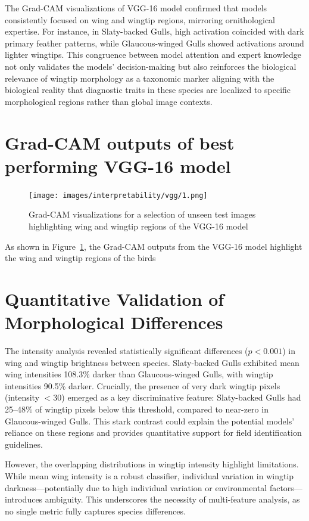 \documentclass[a4paper,12pt]{report}
\begin{document}
The Grad-CAM visualizations of VGG-16 model confirmed that models consistently focused on wing and wingtip regions, mirroring ornithological expertise. For instance, in Slaty-backed Gulls, high activation coincided with dark primary feather patterns, while Glaucous-winged Gulls showed activations around lighter wingtips. This congruence between model attention and expert knowledge not only validates the models’ decision-making but also reinforces the biological relevance of wingtip morphology as a taxonomic marker aligning with the biological reality that diagnostic traits in these species are localized to specific morphological regions rather than global image contexts.


\section{Grad-CAM outputs of best performing VGG-16 model}\label{sec:vg_grad}

\begin{figure}[H]
    \centering
    \texttt{[image: images/interpretability/vgg/1.png]}
    \caption{Grad-CAM visualizations for a selection of unseen test images highlighting wing and wingtip regions of the VGG-16 model}
    \label{fig:vgg16_gradcam}
\end{figure}

As shown in Figure~\ref{fig:vgg16_gradcam}, the Grad-CAM outputs from the VGG-16 model highlight the wing and wingtip regions of the birds
\section{Quantitative Validation of Morphological Differences}
The intensity analysis revealed statistically significant differences ($p < 0.001$) in wing and wingtip brightness between species. Slaty-backed Gulls exhibited mean wing intensities 108.3\% darker than Glaucous-winged Gulls, with wingtip intensities 90.5\% darker. Crucially, the presence of very dark wingtip pixels (intensity $<30$) emerged as a key discriminative feature: Slaty-backed Gulls had 25–48\% of wingtip pixels below this threshold, compared to near-zero in Glaucous-winged Gulls. This stark contrast could explain the potential models’ reliance on these regions and provides quantitative support for field identification guidelines.

However, the overlapping distributions in wingtip intensity highlight limitations. While mean wing intensity is a robust classifier, individual variation in wingtip darkness---potentially due to high individual variation or environmental factors---introduces ambiguity. This underscores the necessity of multi-feature analysis, as no single metric fully captures species differences.
\end{document}
